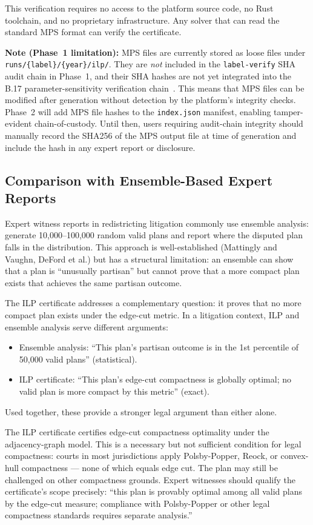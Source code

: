 This verification requires no access to the platform source code,
no Rust toolchain, and no proprietary infrastructure.
Any solver that can read the standard MPS format can verify the certificate.

\textbf{Note (Phase~1 limitation):} MPS files are currently stored as loose
files under \texttt{runs/\{label\}/\{year\}/ilp/}.
They are \emph{not} included in the \texttt{label-verify} SHA audit chain
in Phase~1, and their SHA hashes are not yet integrated into the B.17
parameter-sensitivity verification chain~\citep{b17paper}.
This means that MPS files can be modified after generation without detection
by the platform's integrity checks.
Phase~2 will add MPS file hashes to the \texttt{index.json} manifest,
enabling tamper-evident chain-of-custody.
Until then, users requiring audit-chain integrity should manually record
the SHA256 of the MPS output file at time of generation and include
the hash in any expert report or disclosure.

\subsection{Comparison with Ensemble-Based Expert Reports}

Expert witness reports in redistricting litigation commonly use
ensemble analysis: generate 10{,}000--100{,}000 random valid plans
and report where the disputed plan falls in the distribution.
This approach is well-established (Mattingly and Vaughn, DeFord et al.)
but has a structural limitation: an ensemble can show that a plan is
``unusually partisan'' but cannot prove that a more compact plan exists
that achieves the same partisan outcome.

The ILP certificate addresses a complementary question: it proves that
no more compact plan exists under the edge-cut metric.
In a litigation context, ILP and ensemble analysis serve different
arguments:

\begin{itemize}
\item Ensemble analysis: ``This plan's partisan outcome is in the 1st
  percentile of 50{,}000 valid plans'' (statistical).
\item ILP certificate: ``This plan's edge-cut compactness is globally
  optimal; no valid plan is more compact by this metric'' (exact).
\end{itemize}

Used together, these provide a stronger legal argument than either alone.

The ILP certificate certifies edge-cut compactness optimality under the
adjacency-graph model.
This is a necessary but not sufficient condition for legal compactness:
courts in most jurisdictions apply Polsby-Popper, Reock, or convex-hull
compactness --- none of which equals edge cut.
The plan may still be challenged on other compactness grounds.
Expert witnesses should qualify the certificate's scope precisely:
``this plan is provably optimal among all valid plans by the edge-cut
measure; compliance with Polsby-Popper or other legal compactness
standards requires separate analysis.''
